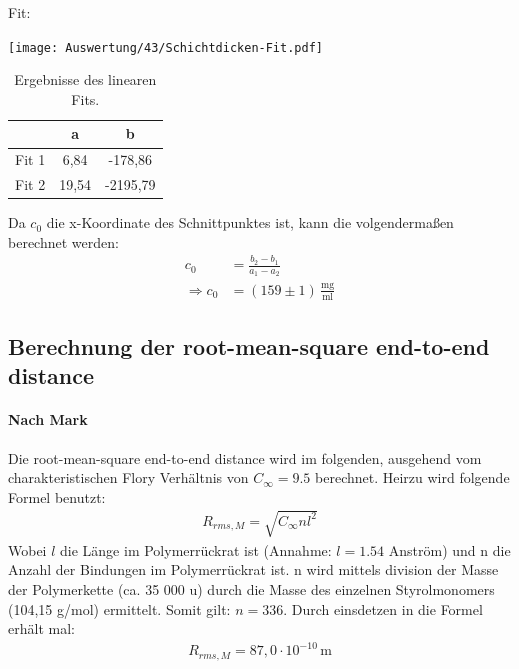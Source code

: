 Fit:
\begin{center}
	\captionsetup{type=figure}
	\texttt{[image: Auswertung/43/Schichtdicken-Fit.pdf]}
	\label{fig:fitgueteReflexion}
\end{center}

\begin{table}[h]
	\centering
	\begin{tabular}{r|c|c}
		& a & b \\ \hline
		Fit 1 & 6,84 & -178,86 \\
		Fit 2 & 19,54 & -2195,79
	\end{tabular}
	\caption[]{Ergebnisse des linearen Fits.}
\end{table}

Da $c_0$ die x-Koordinate des Schnittpunktes ist, kann die volgendermaßen berechnet werden:
\begin{align}
	c_0 &= \frac{b_2 - b_1}{a_1 - a_2}\\
	\Rightarrow c_0 &= (159 \pm 1) \, \frac{\text{mg}}{\text{ml}}
\end{align}

\subsection{Berechnung der root-mean-square end-to-end distance}

\paragraph*{Nach Mark}
Die root-mean-square end-to-end distance wird im folgenden, ausgehend vom charakteristischen Flory Verhältnis von $C_\infty = 9.5$ berechnet. Heirzu wird folgende Formel benutzt:
\begin{gather}
	R_{rms,M} = \sqrt{C_\infty n l^2}
\end{gather}
Wobei $l$ die Länge im Polymerrückrat ist (Annahme: $l = 1.54$ Anström) und n die Anzahl der Bindungen im Polymerrückrat ist. n wird mittels division der Masse der Polymerkette (ca. 35 000 u) durch die Masse des einzelnen Styrolmonomers (104,15 g/mol) ermittelt. Somit gilt: $ n = 336 $.
Durch einsdetzen in die Formel erhält mal:
\begin{gather}
	R_{rms,M} = 87,0 \cdot 10^{-10} \, \text{m}
\end{gather}

